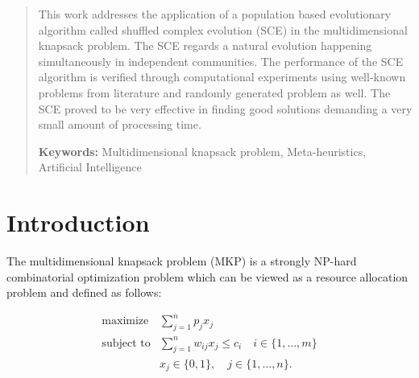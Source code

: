 \documentclass[a0,portrait]{a0poster}
\begin{document}


\begin{multicols}{2} %


\color{Navy} %

\begin{abstract}

This work addresses the application of
a population based evolutionary algorithm
called shuffled complex evolution (SCE) in the multidimensional knapsack
problem.
The SCE regards a natural evolution happening simultaneously in independent communities.
The performance of the SCE algorithm is verified through computational experiments
using well-known problems from literature and randomly generated problem as well.
The SCE proved to be very effective in finding good solutions demanding a
very small amount of processing time.

{\bf Keywords: } Multidimensional knapsack problem, Meta-heuristics, Artificial Intelligence

\end{abstract}


\color{SaddleBrown} %

\section*{Introduction}

The multidimensional knapsack problem (MKP) is a strongly NP-hard combinatorial
optimization problem which can be viewed as a resource allocation problem and
defined as follows:

\begin{align*}
  \text{maximize} & \sum_{j=1}^n p_j x_j \\
  \text{subject to} & \sum_{j=1}^n w_{ij} x_j \leqslant c_i \quad i \in \{1, \ldots, m\}\\
   & x_j \in \{0, 1\}, \quad j \in \{1, \ldots, n\}.
\end{align*}


\end{multicols}
\end{document}

